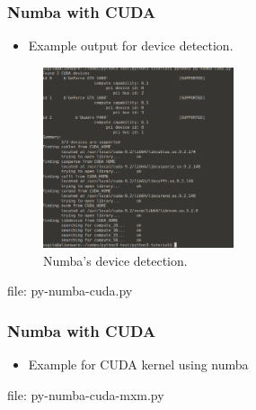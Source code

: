 \begin{frame}[fragile]
\frametitle{Numba with CUDA}
\newcommand{\newfilename}{py-numba-cuda.py}

\begin{itemize}
\item Example output for device detection.
\end{itemize}
\begin{figure}
\includegraphics[width=0.5\textwidth]{dev-numba.png}
\caption{Numba's device detection.}
\end{figure}
file: \newfilename
\end{frame}


\begin{frame}[fragile]
\frametitle{Numba with CUDA}
\begin{itemize}
\item Example for CUDA kernel using numba
\end{itemize}
\newcommand{\newfilename}{py-numba-cuda-mxm.py}

file: \newfilename
\end{frame}

